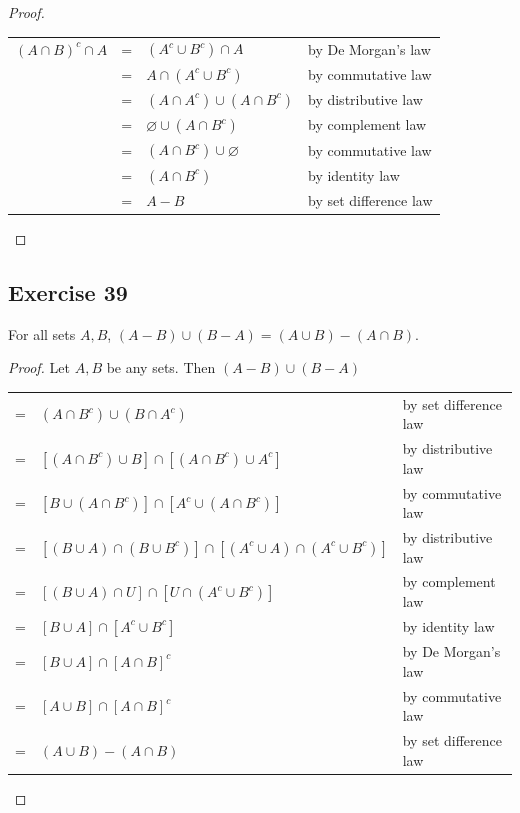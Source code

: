 \documentclass[14pt]{extarticle}
\newcommand{\es}{\varnothing}
\newcommand{\cy}{\color{cyan}}
\begin{document}
\begin{proof}
\begin{center}
\begin{tabular}{rcll}
\((A \cap B)^c \cap A\) & = & \((A^c \cup B^c) \cap A\) & {\cy by De Morgan's law} \\
\(\) & = & \(A \cap (A^c \cup B^c)\) & {\cy by commutative law} \\
\(\) & = & \((A \cap A^c) \cup (A \cap B^c)\) & {\cy by distributive law} \\
\(\) & = & \(\es \cup (A \cap B^c)\) & {\cy by complement law} \\
\(\) & = & \((A \cap B^c) \cup \es\) & {\cy by commutative law} \\
\(\) & = & \((A \cap B^c)\) & {\cy by identity law} \\
\(\) & = & \(A - B\) & {\cy by set difference law}
\end{tabular}
\end{center}
\end{proof}

\subsection{Exercise 39}
For all sets $A, B$, \((A - B) \cup (B - A) = (A \cup B) - (A \cap B)\).

\begin{proof}
Let $A,B$ be any sets. Then \((A - B) \cup (B - A)\)
\begin{center}
\begin{tabular}{cll}
= & \((A \cap B^c) \cup (B \cap A^c)\) & {\cy by set difference law} \\
= & \([(A \cap B^c) \cup B] \cap [(A \cap B^c) \cup A^c]\) & {\cy by distributive law} \\
= & \([B \cup (A \cap B^c)] \cap [A^c \cup (A \cap B^c)]\) & {\cy by commutative law} \\
= & \([(B \cup A) \cap (B \cup B^c)] \cap [(A^c \cup A) \cap (A^c \cup B^c)]\) & {\cy by distributive law} \\
= & \([(B \cup A) \cap U] \cap [U \cap (A^c \cup B^c)]\) & {\cy by complement law} \\
= & \([B \cup A] \cap [A^c \cup B^c]\) & {\cy by identity law} \\
= & \([B \cup A] \cap [A \cap B]^c\) & {\cy by De Morgan's law} \\
= & \([A \cup B] \cap [A \cap B]^c\) & {\cy by commutative law} \\
= & \((A \cup B) - (A \cap B)\) & {\cy by set difference law}
\end{tabular}
\end{center}
\end{proof}
\end{document}
